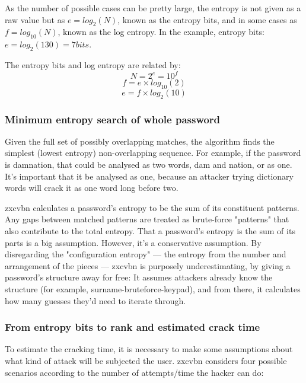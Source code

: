 As the number of possible cases can be pretty large, the entropy is not given as a raw value but as $e = log_{2}(N)$, known as the entropy bits, and in some cases as $f = log_{10}(N)$, known as the log entropy. In the example, entropy bits: $e = log_{2}(130) = 7 bits$.

The entropy bits and log entropy are related by:
\[N = 2^{e} = 10^{f}\]
\[f = e \times log_{10}(2)\]
\[e = f \times log_{2}(10)\]


\subsubsection*{Minimum entropy search of whole password}

Given the full set of possibly overlapping matches, the algorithm finds the simplest (lowest entropy) non-overlapping sequence. For example, if the password is damnation, that could be analysed as two words, dam and nation, or as one. It’s important that it be analysed as one, because an attacker trying dictionary words will crack it as one word long before two.

zxcvbn calculates a password’s entropy to be the sum of its constituent patterns. Any gaps between matched patterns are treated as brute-force "patterns" that also contribute to the total entropy. That a password’s entropy is the sum of its parts is a big assumption. However, it’s a conservative assumption. By disregarding the "configuration entropy" — the entropy from the number and arrangement of the pieces — zxcvbn is purposely underestimating, by giving a password’s structure away for free: It assumes attackers already know the structure (for example, surname-bruteforce-keypad), and from there, it calculates how many guesses they’d need to iterate through.\cite{zxdropbox}

\subsubsection*{From entropy bits to rank and estimated crack time} \label{sec:zxLevels}

To estimate the cracking time, it is necessary to make some assumptions about what kind of attack will be subjected the user. zxcvbn considers four possible scenarios according to the number of attempts/time the hacker can do:

